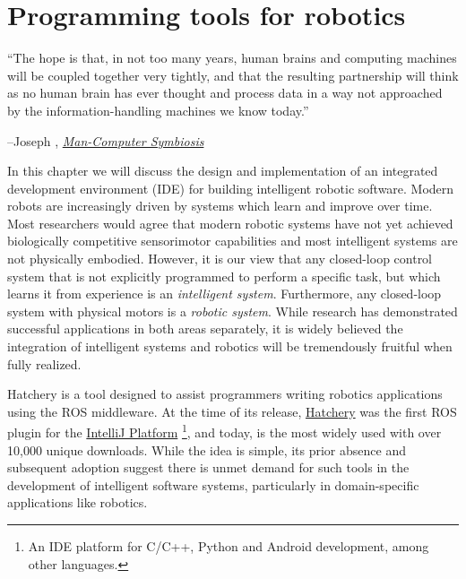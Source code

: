 \documentclass[12pt,initial,twoside,maitrise]{dms}
\numberwithin{equation}{section}
\numberwithin{table}{chapter}
\numberwithin{figure}{chapter}
\begin{document}
\chapter{Programming tools for robotics}\label{ch:hatchery}
\setlength{\epigraphwidth}{0.78\textwidth}
\epigraph{``The hope is that, in not too many years, human brains and computing machines will be coupled together very tightly, and that the resulting partnership will think as no human brain has ever thought and process data in a way not approached by the information-handling machines we know today.''}{\begin{flushright}--Joseph \citet{licklider1960man}, \href{https://groups.csail.mit.edu/medg/people/psz/Licklider.html}{\textit{Man-Computer Symbiosis}}\end{flushright}}

In this chapter we will discuss the design and implementation of an integrated development environment (IDE) for building intelligent robotic software. Modern robots are increasingly driven by systems which learn and improve over time. Most researchers would agree that modern robotic systems have not yet achieved biologically competitive sensorimotor capabilities and most intelligent systems are not physically embodied. However, it is our view that any closed-loop control system that is not explicitly programmed to perform a specific task, but which learns it from experience is an \textit{intelligent system}. Furthermore, any closed-loop system with physical motors is a \textit{robotic system}. While research has demonstrated successful applications in both areas separately, it is widely believed the integration of intelligent systems and robotics will be tremendously fruitful when fully realized.

Hatchery is a tool designed to assist programmers writing robotics applications using the ROS middleware. At the time of its release, \href{https://github.com/duckietown/hatchery}{Hatchery} was the first ROS plugin for the \href{https://www.jetbrains.org/intellij/sdk/docs}{IntelliJ Platform} \footnote{An IDE platform for C/C++, Python and Android development, among other languages.}, and today, is the most widely used with over 10,000 unique downloads. While the idea is simple, its prior absence and subsequent adoption suggest there is unmet demand for such tools in the development of intelligent software systems, particularly in domain-specific applications like robotics.
%
\end{document}
